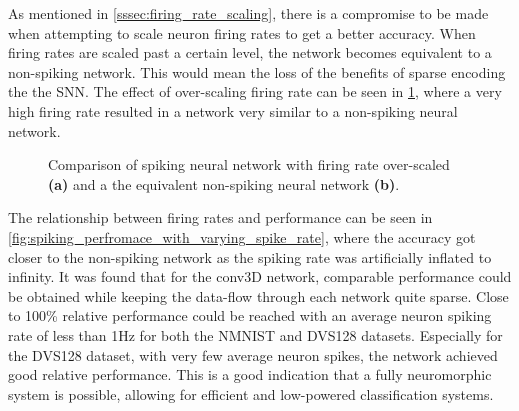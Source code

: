 As mentioned in \cref{sssec:firing_rate_scaling}, there is a compromise to be made when attempting to scale neuron firing rates to get a better accuracy. When firing rates are scaled past a certain level, the network becomes equivalent to a non-spiking network. This would mean the loss of the benefits of sparse encoding the the SNN. The effect of over-scaling firing rate can be seen in \cref{fig:over_scaling_firing_rate}, where a very high firing rate resulted in a network very similar to a non-spiking neural network.

\begin{figure}[htb]%
    \centering
    \qquad
    \caption{Comparison of spiking neural network with firing rate over-scaled \textbf{(a)} and a the equivalent non-spiking neural network \textbf{(b)}.}%
    \label{fig:over_scaling_firing_rate}%
\end{figure}

The relationship between firing rates and performance can be seen in \cref{fig:spiking_perfromace_with_varying_spike_rate}, where the accuracy got closer to the non-spiking network as the spiking rate was artificially inflated to infinity. It was found that for the conv3D network, comparable performance could be obtained while keeping the data-flow through each network quite sparse. Close to 100\% relative performance could be reached with an average neuron spiking rate of less than 1Hz for both the NMNIST and DVS128 datasets. Especially for the DVS128 dataset, with very few average neuron spikes, the network achieved good relative performance. This is a good indication that a fully neuromorphic system is possible, allowing for efficient and low-powered classification systems.

